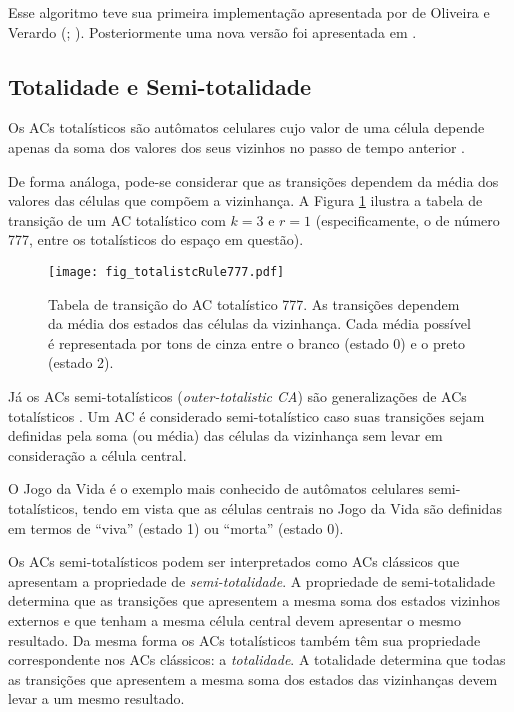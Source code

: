 Esse algoritmo teve sua primeira implementação apresentada por de Oliveira e Verardo (\citeyear{deOliveira2014}; \citeyear{deOliveira2014b}). Posteriormente uma nova versão foi apresentada em \cite{Verardo2014}.

\subsection{Totalidade e Semi-totalidade}
Os ACs totalísticos são autômatos celulares cujo valor de uma célula depende apenas da soma dos valores dos seus vizinhos no passo de tempo anterior \cite{wolfram1983statistical}.

De forma análoga, pode-se considerar que as transições dependem da média dos valores das células que compõem  a vizinhança. A Figura \ref{fig:totalistcRule} ilustra a tabela de transição de um AC totalístico com $k = 3$ e $r = 1$ (especificamente, o de número 777, entre os totalísticos do espaço em questão).

	\begin{figure}[h!]
	  \centering
	  \texttt{[image: fig\_totalistcRule777.pdf]}
	  \caption{Tabela de transição do AC totalístico 777. As transições dependem da média dos estados das células da vizinhança. Cada média possível é representada por tons de cinza entre o branco (estado 0) e o preto (estado 2).}
	  \label{fig:totalistcRule}
	\end{figure}

Já os ACs semi-totalísticos (\textit{outer-totalistic CA}) são generalizações de ACs totalísticos \cite{weisstein2015outerTotalistic}. Um AC é considerado semi-totalístico caso suas transições sejam definidas pela soma (ou média) das células da vizinhança sem levar em consideração a célula central.

O Jogo da Vida \cite{GardnerM1970} é o exemplo mais conhecido de autômatos celulares semi-totalísticos, tendo em vista que as células centrais no Jogo da Vida são definidas em termos de ``viva'' (estado 1) ou ``morta'' (estado 0).

Os ACs semi-totalísticos podem ser interpretados como ACs clássicos que apresentam a propriedade de \textit{semi-totalidade}. A propriedade de semi-totalidade determina que as transições que apresentem a mesma soma dos estados vizinhos externos e que tenham a mesma célula central devem apresentar o mesmo resultado. Da mesma forma os ACs totalísticos também têm sua propriedade correspondente nos ACs clássicos: a \textit{totalidade}. A totalidade determina que todas as transições que apresentem a mesma soma dos estados das vizinhanças devem levar a um mesmo resultado.

